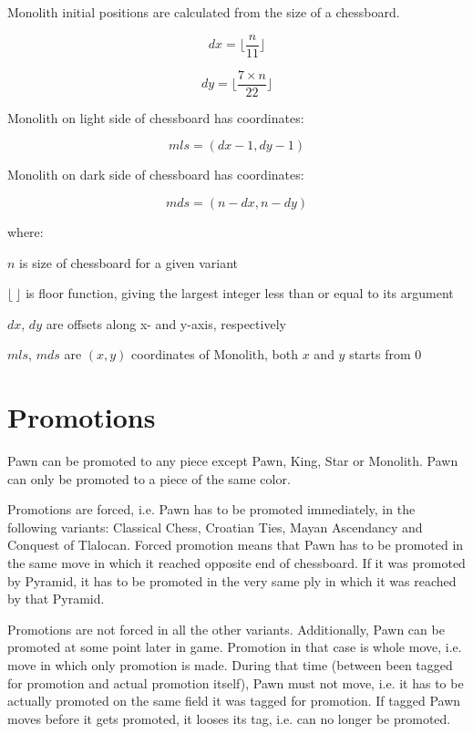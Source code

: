 Monolith initial positions are calculated from the size of a chessboard.

\begin{equation}
dx = \lfloor \frac{n}{11} \rfloor
\end{equation}

\begin{equation}
dy = \lfloor \frac{7 \times n}{22} \rfloor
\end{equation}

Monolith on light side of chessboard has coordinates:

\begin{equation}
mls = (dx - 1, dy - 1)
\end{equation}

Monolith on dark side of chessboard has coordinates:

\begin{equation}
mds = (n - dx, n - dy)
\end{equation}

where:

$n$ is size of chessboard for a given variant

$\lfloor\ \rfloor$ is floor function, giving the largest integer less than or equal to its argument

$dx$, $dy$ are offsets along x- and y-axis, respectively

$mls$, $mds$ are $(x, y)$ coordinates of Monolith, both $x$ and $y$ starts from $0$

\clearpage %

\section*{Promotions}
\label{sec:Definitions/Promotions}

Pawn can be promoted to any piece except Pawn, King, Star or Monolith.
Pawn can only be promoted to a piece of the same color.

Promotions are forced, i.e. Pawn has to be promoted immediately, in the following
variants: Classical Chess, Croatian Ties, Mayan Ascendancy and Conquest of Tlalocan.
Forced promotion means that Pawn has to be promoted in the same move in which it
reached opposite end of chessboard. If it was promoted by Pyramid, it has to be
promoted in the very same ply in which it was reached by that Pyramid.

Promotions are not forced in all the other variants. Additionally, Pawn can be promoted
at some point later in game. Promotion in that case is whole move, i.e. move in which
only promotion is made. During that time (between been tagged for promotion and actual
promotion itself), Pawn must not move, i.e. it has to be actually promoted on the same
field it was tagged for promotion. If tagged Pawn moves before it gets promoted, it
looses its tag, i.e. can no longer be promoted.

